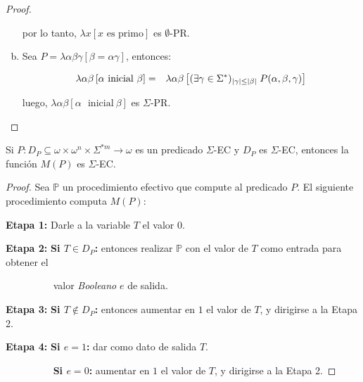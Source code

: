 \begin{proof}
\begin{enumerate}[a)]
        \par por lo tanto, $\lambda x\left[x \text{ es primo}\right]$ es $\emptyset$-PR.

      \item Sea $P = \lambda \alpha\beta\gamma \left[\beta = \alpha\gamma\right]$, entonces:

        \begin{eqnarray}
          \nonumber \lambda \alpha\beta \left[\alpha \text{\ }\mathrm{ inicial}\ \beta \right] &=& \lambda \alpha\beta
            \left[(\exists \gamma \in \Sigma^{\ast})_{\lvert \gamma \rvert \leq \lvert \beta \rvert} \; P(\alpha, \beta,
            \gamma)\right]
        \end{eqnarray}

        \par luego, $\lambda \alpha\beta \left[\alpha \text{\ }\mathrm{ inicial}\ \beta \right]$ es $\Sigma$-PR.
    \end{enumerate}
  \end{proof}

  \begin{lemma}
    \par Si $P: D_{P} \subseteq \omega \times \omega^{n} \times \Sigma^{\ast m} \rightarrow \omega$ es un predicado
    $\Sigma$-EC y $ D_{P}$ es $\Sigma$-EC, entonces la función $M(P)$ es $\Sigma$-EC.
  \end{lemma}
  \begin{proof}
    \par Sea $\mathbb{P}$ un procedimiento efectivo que compute al predicado $P$. El siguiente procedimiento computa
    $M(P)$:

    \vspace{3mm}
    \textbf{Etapa 1:}
    Darle a la variable $T$ el valor $0$.

    \textbf{Etapa 2:}
    \textbf{Si $T \in D_{P}$:} entonces realizar $\mathbb{P}$ con el valor de $T$ como entrada para obtener el

    $\qquad\qquad\;\;\;$valor \textit{Booleano} $e$ de salida.

    \textbf{Etapa 3:}
    \textbf{Si $T \notin D_{P}$:} entonces aumentar en $1$ el valor de $T$, y dirigirse a la Etapa 2.

    \textbf{Etapa 4:}
    \textbf{Si $e=1$:} dar como dato de salida $T$.

    $\qquad\qquad\;\;\;$\textbf{Si $e=0$:} aumentar en $1$ el valor de $T$, y dirigirse a la Etapa 2.
  \end{proof}

